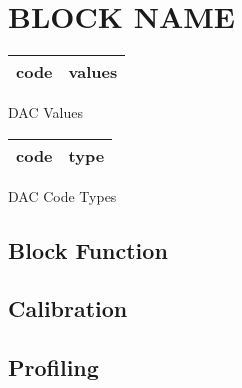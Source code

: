 \chapter{BLOCK NAME}



\begin{marginfigure}
    \small
    \begin{tabular}{l|l}
      code &values\\
      \hline
    \end{tabular}
    \caption{DAC Values \cite{fu.h}}
    \label{block:codes}
\end{marginfigure}
\begin{marginfigure}
    \small
    \begin{tabular}{l|l}
      code & type \\
      \hline
    \end{tabular}
    \caption{DAC Code Types\cite{fu.h}}
    \label{block:codes}
  \end{marginfigure}

  
\section{Block Function}\label{block:blockfun}

\begin{algorithmic}
\end{algorithmic}


\section{Calibration}\label{block:calib}


\begin{algorithmic}
\end{algorithmic}

\section{Profiling}\label{block:calib}